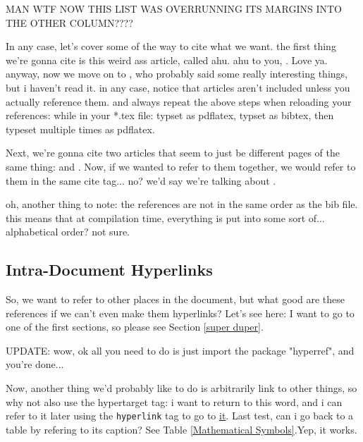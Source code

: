 \documentclass[a4paper,12pt]{article} %
\begin{document}
MAN WTF NOW THIS LIST WAS OVERRUNNING ITS MARGINS INTO THE OTHER COLUMN????

In any case, let's cover some of the way to cite what we want. the first thing we're gonna cite is this weird ass article, called ahu. ahu to you, \cite{ahu61}. Love ya. anyway, now we move on  to \cite{ab94}, who probably said some really interesting things, but i haven't read it. in any case, notice that articles aren't included unless you actually reference them. and always repeat the above steps when reloading your references: while in your *.tex file: typset as pdflatex, typset as bibtex, then typeset multiple times as pdflatex. 

Next, we're gonna cite two articles that seem to just be different pages of the same thing: \cite{m85} and \cite{m99}. Now, if we wanted to refer to them together, we would refer to them in the same cite tag... no? we'd say we're talking about \cite{m85,m99}.

oh, another thing to note: the references are not in the same order as the bib file. this means that at compilation time, everything is put into some sort of... alphabetical order? not sure.

\subsection{Intra-Document Hyperlinks}
So, we want to refer to other places in the document, but what good are these references if we can't even make them hyperlinks? Let's see here: I want to go to one of the first sections, so please see Section \ref{super duper}. 

UPDATE: wow, ok all you need to do is just import the package "hyperref", and you're done...

Now, another thing we'd probably like to do is arbitrarily link to other things, so why not also use the hypertarget tag: 
i want to return to this \hypertarget{special_word}{word}, and i can refer to it later using the \texttt{hyperlink} tag to go to \hyperlink{special_word}{it}. 
Last test, can i go back to a table by refering to its caption? See Table \ref{Mathematical Symbols}.Yep, it works.








\end{document}
